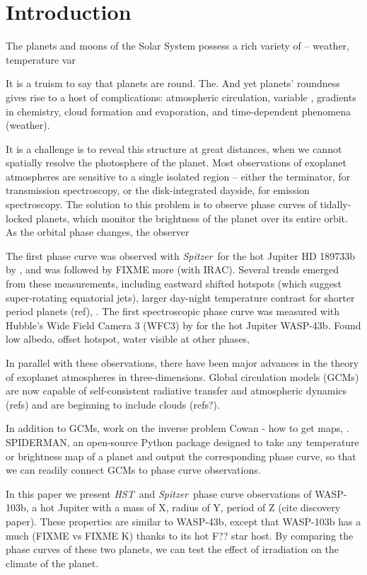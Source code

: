 \documentclass[twocolumn]{aastex61}
\newcommand{\project}[1]{\textsl{#1}}
\newcommand{\HST}{\project{HST}}
\newcommand{\Spitzer}{\project{Spitzer}}
\begin{document}
\section{Introduction} \label{sec:intro}
The planets and moons of the Solar System possess a rich variety of -- weather, temperature var

It is a truism to say that planets are round.  The. And yet planets' roundness gives rise to a host of complications:  atmospheric circulation, variable , gradients in chemistry, cloud formation and evaporation, and time-dependent phenomena (weather).

It is a challenge is to reveal this structure at great distances, when we cannot spatially resolve the photosphere of the planet.  Most observations of exoplanet atmospheres are sensitive to a single isolated region  -- either the terminator, for transmission spectroscopy, or the disk-integrated dayside, for emission spectroscopy.  The solution to this problem is to observe phase curves of tidally-locked planets, which monitor the brightness of the planet over its entire orbit. As the orbital phase changes, the observer 

The first phase curve was observed with \Spitzer\ for the hot Jupiter HD 189733b by \citep{knutson??}, and was followed by FIXME more (with IRAC). Several trends emerged from these measurements, including eastward shifted hotspots (which suggest super-rotating equatorial jets), larger day-night temperature contrast for shorter period planets (ref), . The first spectroscopic phase curve was measured with Hubble's Wide Field Camera 3 (WFC3) by \citep{stevenson???} for the hot Jupiter WASP-43b. Found low albedo, offset hotspot, water visible at other phases, 

In parallel with these observations, there have been major advances in the theory of exoplanet atmospheres in three-dimensions. Global circulation models (GCMs) are now capable of self-consistent radiative transfer and atmospheric dynamics (refs) and are beginning to include clouds (refs?). 

In addition to GCMs, work on the inverse problem Cowan - how to get maps, . SPIDERMAN, an open-source Python package designed to take any temperature or brightness map of a planet and output the corresponding phase curve, so that we can readily connect GCMs to phase curve observations.  


In this paper we present \HST\ and \Spitzer\ phase curve observations of WASP-103b, a hot Jupiter with a mass of X, radius of Y, period of Z (cite discovery paper). These properties are similar to WASP-43b, except that WASP-103b has a much (FIXME vs FIXME K) thanks to its hot F?? star host. By comparing the phase curves of these two planets, we can test the effect of irradiation on the climate of the planet.
\end{document}
